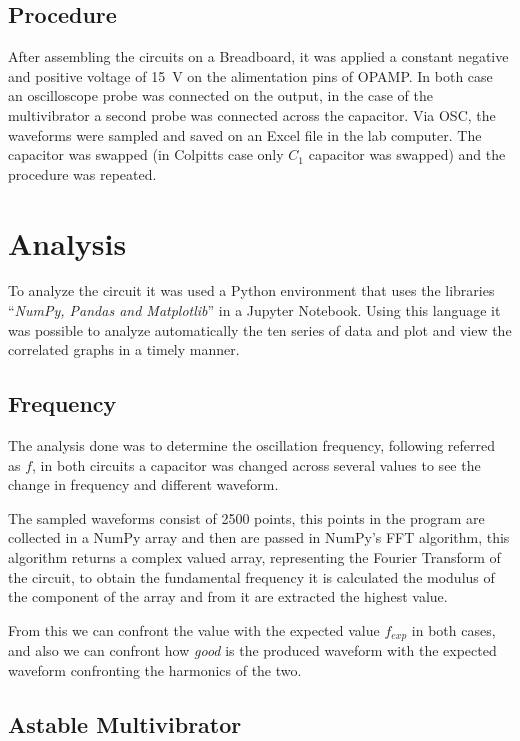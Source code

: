 \documentclass[a4paper, twocolumn]{article}
\begin{document}
\subsection{Procedure}

After assembling the circuits on a Breadboard, it was applied a constant negative and positive voltage of \SI{15}{\volt} on the alimentation pins of OPAMP. In both case an oscilloscope probe was connected on the output, in the case of the multivibrator a second probe was connected across the capacitor.  Via OSC, the waveforms were sampled and saved on an Excel file in the lab computer. 
The capacitor was swapped (in Colpitts case only $C_1$ capacitor was swapped) and the procedure was repeated.

\section{Analysis}

To analyze the circuit it was used a Python environment that uses the libraries ``\emph{NumPy, Pandas and Matplotlib}'' in a Jupyter Notebook. Using this language it was possible to analyze automatically the ten series of data and plot and view the correlated graphs in a timely manner. 


\subsection{Frequency}

The analysis done was to determine the oscillation frequency, following referred as $f$, in both circuits a capacitor was changed across several values to see the change in frequency and different waveform.

The sampled waveforms consist of 2500 points, this points in the program are collected in a NumPy array and then are passed in NumPy's FFT algorithm, this algorithm returns a complex valued array, representing the Fourier Transform of the circuit, to obtain the fundamental frequency it is calculated the modulus of the component of the array and from it are extracted the highest value.

From this we can confront the value with the expected value $f_{exp} $ in both cases, and also we can confront how \emph{good} is the produced waveform with the expected waveform confronting the harmonics of the two.

\subsection{Astable Multivibrator}
\end{document}
